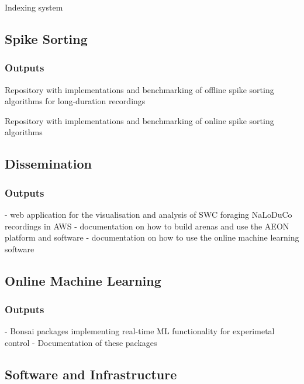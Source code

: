\documentclass[12pt]{article}
\begin{document}
Indexing system

\subsection{Spike Sorting}

\subsubsection{Outputs}

Repository with implementations and benchmarking of offline spike sorting algorithms for long-duration recordings

Repository with implementations and benchmarking of online spike sorting algorithms

\subsection{Dissemination}
\label{sec:dissemination}

\subsubsection{Outputs}

- web application for the visualisation and analysis of SWC foraging NaLoDuCo recordings in AWS
- documentation on how to build arenas and use the AEON platform and software
- documentation on how to use the online machine learning software

\subsection{Online Machine Learning}

\subsubsection{Outputs}

- Bonsai packages implementing real-time ML functionality for experimetal control
- Documentation of these packages

\subsection{Software and Infrastructure}
\end{document}
